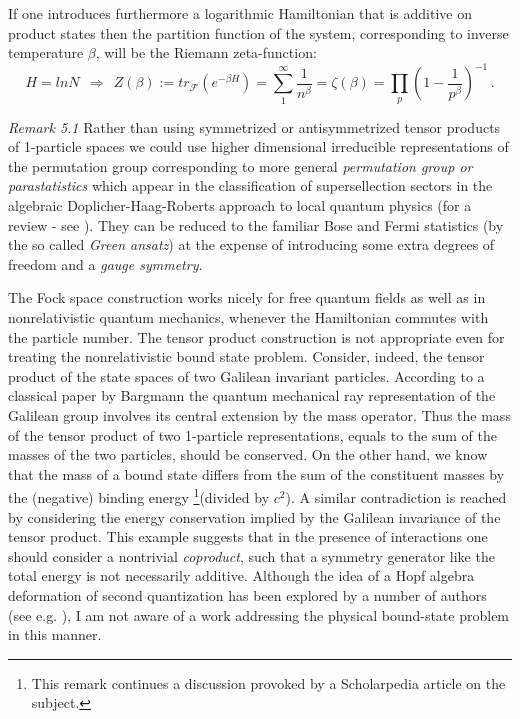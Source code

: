 \documentclass[12pt]{article}
\begin{document}
If one introduces furthermore a logarithmic Hamiltonian that is additive on 
product states then the partition function of the system, corresponding to 
inverse temperature $\beta$, will be the Riemann zeta-function:
\begin{equation}
\label{HZ}
H = ln N \ \ \Rightarrow \ \ Z(\beta):= tr_{\mathcal F}(e^{-\beta H}) = \sum_1^\infty \frac{1}{n^\beta} =\zeta(\beta)=
\prod_p(1-\frac{1}{p^\beta})^{-1}\,.
\end{equation}

{\it Remark 5.1} Rather than using symmetrized or antisymmetrized tensor products of 1-particle spaces we could use higher
dimensional irreducible representations of the permutation group corresponding to more general {\it permutation group or
parastatistics} which appear in the classification of supersellection sectors in the algebraic Doplicher-Haag-Roberts
approach to local quantum physics (for a review - see \cite{H}). They can be reduced to the familiar Bose and Fermi
statistics (by the so called {\it Green ansatz}) at the expense of introducing some extra degrees of freedom and a
{\it gauge symmetry}.

The Fock space construction works nicely for free quantum fields as well as in nonrelativistic quantum mechanics, whenever the Hamiltonian commutes with the particle number. The tensor product construction is not appropriate even for treating the nonrelativistic bound state problem. Consider, indeed, the tensor product of the state spaces of two Galilean invariant particles. According to a classical paper by Bargmann \cite{B54} the quantum mechanical ray representation of the Galilean group involves its central extension by the mass operator. Thus the mass of the tensor product of two 1-particle representations, equals to the sum of the masses of the two particles, should be conserved. On the other hand, we know that the mass of a bound state differs from the sum of the constituent masses by the (negative) binding energy \footnote{This remark continues a discussion provoked by a Scholarpedia article on the subject.}(divided by $c^2$). A similar contradiction is reached by considering the energy conservation implied by the Galilean invariance of the tensor product. This example suggests that in the presence of interactions one should consider a nontrivial {\it coproduct}, such that a symmetry generator like the total energy is not necessarily additive. Although the idea of a Hopf algebra deformation of second quantization has been explored by a number of authors (see e.g. \cite{CCT}), I am not aware of a work addressing the physical bound-state problem in this manner.
\end{document}
